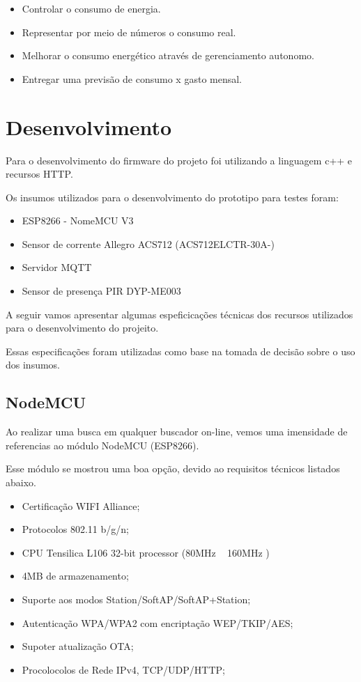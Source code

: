 \documentclass[openright]{normas-utf-tex} %
\begin{document}
\begin{itemize}
	\item Controlar o consumo de energia.
	\item Representar por meio de números o consumo real. 
	\item Melhorar o consumo energético através de gerenciamento autonomo.
	\item Entregar uma previsão de consumo x gasto mensal.
\end{itemize}


\chapter{Desenvolvimento}
\label{chap:desenv}

 
Para o desenvolvimento do firmware do projeto foi utilizando a linguagem c++   \cite{Altabooks} e recursos HTTP.

Os insumos utilizados para o desenvolvimento do prototipo para testes foram:

\begin{itemize}
       	\item ESP8266 - NomeMCU V3
        \item Sensor de corrente Allegro ACS712 (ACS712ELCTR-30A-)
        \item Servidor MQTT
        \item Sensor de presença PIR DYP-ME003
\end{itemize}

A seguir vamos apresentar algumas espeficicações técnicas dos recursos utilizados para o desenvolvimento do projeito.

Essas especificações foram utilizadas como base na tomada de decisão sobre o uso dos insumos. 

\section{NodeMCU}
Ao realizar uma busca em qualquer buscador on-line, vemos uma imensidade de referencias ao módulo NodeMCU (ESP8266).

Esse módulo se mostrou uma boa opção, devido ao requisitos técnicos listados abaixo.

\begin{itemize}
    \item Certificação WIFI Alliance;  \cite{espressif}
    \item Protocolos 802.11 b/g/n;\cite{espressif}
    \item CPU Tensilica L106 32-bit processor (80MHz ~ 160MHz )  \cite{Novatec}
    \item 4MB de armazenamento;
    \item Suporte aos modos Station/SoftAP/SoftAP+Station;\cite{espressif}
    \item Autenticação WPA/WPA2 com encriptação WEP/TKIP/AES;\cite{espressif}
    \item Supoter atualização OTA;\cite{espressif}
    \item Procolocolos de Rede IPv4, TCP/UDP/HTTP;\cite{espressif}
\end{itemize}
\end{document}
